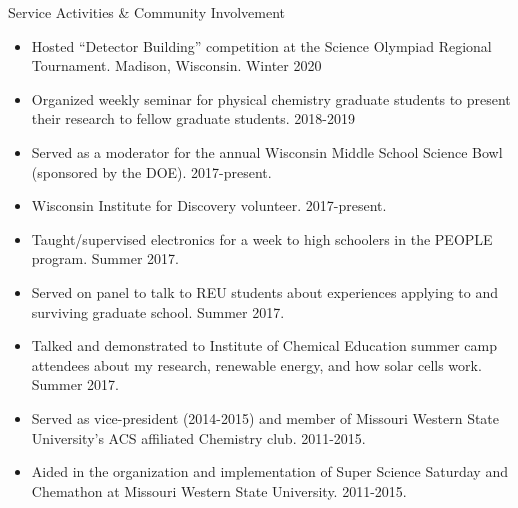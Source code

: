 \documentclass{resume} %
\begin{document}

\begin{rSection}{Service Activities \& Community Involvement}

\begin{itemize}[leftmargin = 0 pt]
	\item Hosted ``Detector Building'' competition at the Science Olympiad Regional Tournament. Madison, Wisconsin. Winter 2020
	\item Organized weekly seminar for physical chemistry graduate students to present their research to fellow graduate students. 2018-2019
	\item Served as a moderator for the annual Wisconsin Middle School Science Bowl (sponsored by the DOE). 2017-present.
	\item Wisconsin Institute for Discovery volunteer. 2017-present. 
	\item Taught/supervised electronics for a week to high schoolers in the PEOPLE program. Summer 2017.
	\item Served on panel to talk to REU students about experiences applying to and surviving graduate school. Summer 2017.
	\item Talked and demonstrated to Institute of Chemical Education summer camp attendees about my research, renewable energy, and how solar cells work. Summer 2017.  
	\item Served as vice-president (2014-2015) and member of Missouri Western State University's ACS affiliated Chemistry club. 2011-2015.
	\item Aided in the organization and implementation of Super Science Saturday and Chemathon at Missouri Western State University. 2011-2015.	
\end{itemize}

\end{rSection}

\pagebreak
\end{document}

